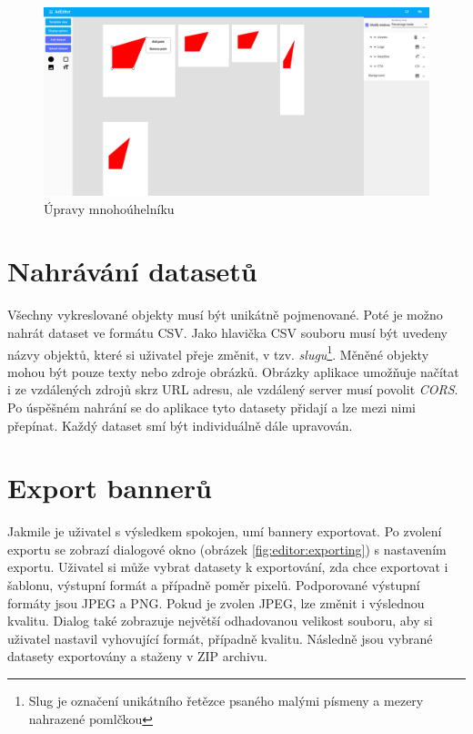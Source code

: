     \begin{figure}[h]
        \includegraphics[width=1.0\textwidth]{Figures/editor/polygon.png}
        \caption{Úpravy mnohoúhelníku}
        \label{fig:editor:polygon}
    \end{figure}

\section{Nahrávání datasetů}
    Všechny vykreslované objekty musí být unikátně pojmenované.
    Poté je možno nahrát dataset ve formátu CSV. Jako hlavička CSV souboru musí být uvedeny názvy objektů, které si uživatel přeje změnit, v tzv.
    \emph{slugu}\footnote[2]{Slug je označení unikátního řetězce psaného malými písmeny a mezery nahrazené pomlčkou}. Měněné objekty mohou být pouze texty nebo zdroje obrázků. Obrázky aplikace umožňuje načítat i ze vzdálených zdrojů skrz 
    URL adresu, ale vzdálený server musí povolit \emph{CORS}. Po úspěšném nahrání se do aplikace tyto datasety přidají a lze mezi nimi přepínat. Každý
    dataset smí být individuálně dále upravován.

\section{Export bannerů}
    Jakmile je uživatel s výsledkem spokojen, umí bannery exportovat. Po zvolení exportu se zobrazí dialogové okno (obrázek \ref{fig:editor:exporting}) s nastavením exportu.
    Uživatel si může vybrat datasety k exportování, zda chce exportovat i šablonu, výstupní formát a případně poměr pixelů.
    Podporované výstupní formáty jsou JPEG a PNG. Pokud je zvolen JPEG, lze změnit i výslednou kvalitu.
    Dialog také zobrazuje největší odhadovanou velikost souboru, aby si uživatel nastavil vyhovující formát, případně kvalitu.
    Následně jsou vybrané datasety exportovány a staženy v ZIP archivu.

